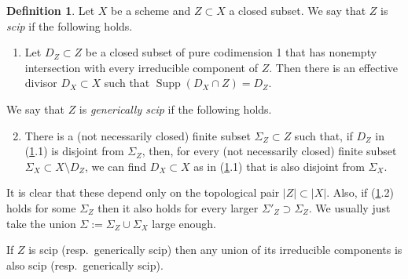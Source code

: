\documentclass{amsart}
\theoremstyle{definition}
\newtheorem{defn}[thm]{Definition}
\theoremstyle{remark}
\newcommand{\supp}[0]{\operatorname{Supp}}
\begin{document}
\begin{defn}\label{ci.defn.red.3} Let $X$ be a scheme and $Z\subset X$ a closed   subset.
We say that  $Z$ is  {\it scip}  if 
the following holds.
\begin{enumerate}
\item  Let $D_Z\subset Z$ be a closed  subset  of pure codimension 1 that  has nonempty intersection with every irreducible component of $Z$.   Then there is an effective divisor $D_X\subset X$ 
such that $\supp(D_X\cap Z)=D_Z$.
\end{enumerate}
We say that  $Z$ is   {\it generically scip} if the following holds.
\begin{enumerate}\setcounter{enumi}{1}
\item  There is a (not necessarily closed) finite subset $\Sigma_Z\subset Z$ such that, if $D_Z$ in (\ref{ci.defn.red.3}.1) is disjoint from $\Sigma_Z$, then, 
for every (not necessarily closed) finite subset $\Sigma_X\subset X\setminus D_Z$,
we can find
$D_X\subset X$  as in (\ref{ci.defn.red.3}.1) that is also    disjoint from $\Sigma_X$.
\end{enumerate}
It is clear that these depend only on the topological pair $|Z|\subset |X|$.
Also, if (\ref{ci.defn.red.3}.2) holds for some $\Sigma_Z$ then it also holds for every larger $\Sigma'_Z\supset \Sigma_Z$.  We usually just take the union 
$\Sigma:=\Sigma_Z\cup \Sigma_X$ large enough.



If $Z$ is scip (resp.\ generically scip) then any union of its irreducible components is also scip (resp.\ generically scip).
\end{defn}
\end{document}
